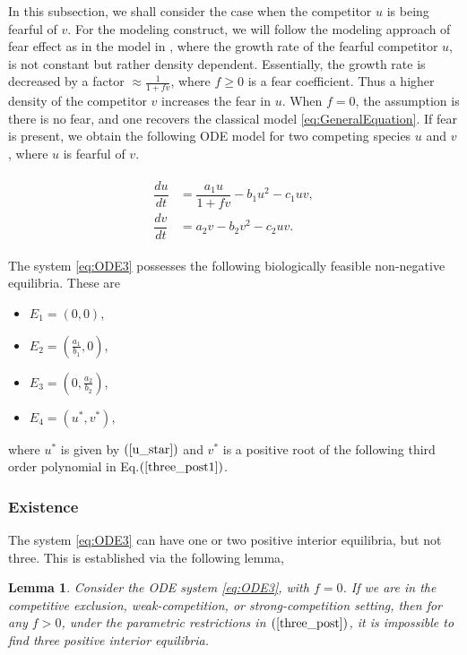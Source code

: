 \documentclass[10pt]{amsart}
\newtheorem{lemma}[theorem]{Lemma}
\theoremstyle{definition}
\begin{document}
In this subsection, we shall consider the case when the competitor $u$ is being fearful of $v$. For the modeling construct, we will follow the modeling approach of  fear effect as in the model  in \cite{Wang16}, where the growth rate of the fearful competitor $u$, is not constant but rather density dependent. Essentially, the growth rate is decreased by a factor $\approx \frac{1}{1+f v}$, where $f \geq 0$ is a fear coefficient. Thus a higher density of the competitor $v$ increases the fear in $u$. When $f=0$, the assumption is there is no fear, and one recovers the classical model \eqref{eq:GeneralEquation}. If fear is present, we obtain the following ODE model for two competing species $u$ and $v$, where $u$ is fearful of $v$.

\begin{align}\label{eq:ODE3}
	\begin{split}
		\dfrac{du}{dt}&= \dfrac{a_1 u}{1+fv}  -b_1 u^2 -c_1 uv,\\
	\dfrac{dv}{dt} &= a_2v -b_2 v^2 -c_2 uv.
	\end{split}
\end{align}

The system \eqref{eq:ODE3} possesses the following biologically feasible non-negative equilibria. These are 
\begin{itemize}
	\item $E_1=(0,0)$,
	\item $E_2=(\frac{a_1}{b_1},0 )$,
	\item $E_3=(0,\frac{a_2}{b_2} )$,
	\item $E_4=(u^*,v^*)$,
\end{itemize}
where $u^*$ is given by $(\ref{u_star})$ and $v^*$ is a positive root of the following third order polynomial in  Eq.$(\ref{three_post1})$.
\subsubsection{Existence}
The system \eqref{eq:ODE3} can have one or two positive interior equilibria, but not three. This is established via the following lemma,

\begin{lemma}
\label{lem:n3}
Consider the ODE system \eqref{eq:ODE3}, with $f=0$. If we are in the competitive exclusion, weak-competition, or strong-competition setting, then for any $f>0$, under the parametric restrictions in  $(\ref{three_post})$, it is impossible to find  three positive interior equilibria. 
\end{lemma}
\end{document}
